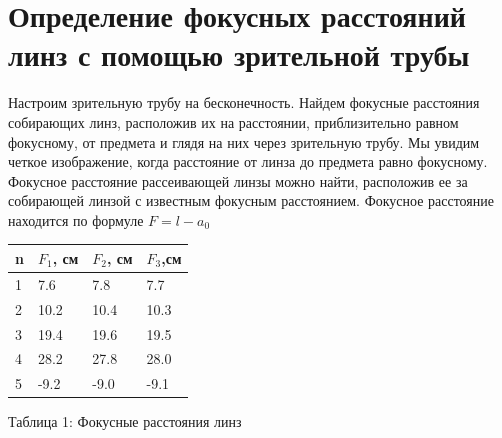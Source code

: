 \documentclass[14pt,a4paper]{scrartcl}
\begin{document}
\section{Определение фокусных расстояний линз с помощью зрительной трубы}
Настроим зрительную трубу на бесконечность. Найдем фокусные расстояния собирающих
линз, расположив их на расстоянии, приблизительно равном фокусному, от предмета и
глядя на них через зрительную трубу. Мы увидим четкое изображение, когда расстояние
от линза до предмета равно фокусному. Фокусное расстояние рассеивающей линзы можно
найти, расположив ее за собирающей линзой с известным фокусным расстоянием. Фокусное расстояние находится по формуле $F=l-a_{0}$







    
































\begin{center}
\begin{tabular}{|l|l|l|l|}
\hline
n & $F_{1}$, см & $F_{2}$, см & $F_{3}$,см \\ \hline
1 & 7.6    & 7.8    & 7.7  \\ \hline
2 & 10.2   & 10.4   & 10.3 \\ \hline
3 & 19.4   & 19.6   & 19.5 \\ \hline
4 & 28.2   & 27.8   & 28.0 \\ \hline
5 & -9.2   & -9.0   & -9.1 \\ \hline
\end{tabular}

\end{center}
\begin{center}
Таблица 1: Фокусные расстояния линз
\end{center}
\end{document}
